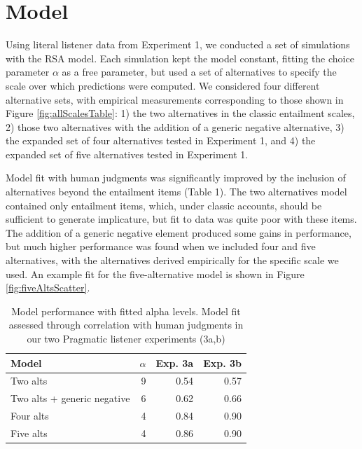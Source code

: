 \documentclass[10pt, letterpaper]{article}
\begin{document}
\section{Model}\label{model}

Using literal listener data from Experiment 1, we conducted a set of
simulations with the RSA model. Each simulation kept the model constant,
fitting the choice parameter \(\alpha\) as a free parameter, but used a
set of alternatives to specify the scale over which predictions were
computed. We considered four different alternative sets, with empirical
measurements corresponding to those shown in Figure
\ref{fig:allScalesTable}: 1) the two alternatives in the classic
entailment scales, 2) those two alternatives with the addition of a
generic negative alternative, 3) the expanded set of four alternatives
tested in Experiment 1, and 4) the expanded set of five alternatives
tested in Experiment 1.

Model fit with human judgments was significantly improved by the
inclusion of alternatives beyond the entailment items (Table 1). The two
alternatives model contained only entailment items, which, under classic
accounts, should be sufficient to generate implicature, but fit to data
was quite poor with these items. The addition of a generic negative
element produced some gains in performance, but much higher performance
was found when we included four and five alternatives, with the
alternatives derived empirically for the specific scale we used. An
example fit for the five-alternative model is shown in Figure
\ref{fig:fiveAltsScatter}.

\begin{table}[ht]
\centering
\begin{tabular}{lrrr}
  \hline
Model & $\alpha$ & Exp. 3a & Exp. 3b \\ 
  \hline
Two alts &   9 & 0.54 & 0.57 \\ 
  Two alts + generic negative  &   6 & 0.62 & 0.66 \\ 
  Four alts &   4 & 0.84 & 0.90 \\ 
  Five alts &   4 & 0.86 & 0.90 \\ 
   \hline
\end{tabular}
\caption{Model performance with fitted alpha levels. Model fit assessed through correlation with human judgments in our two Pragmatic listener experiments (3a,b)} 
\end{table}
\end{document}
